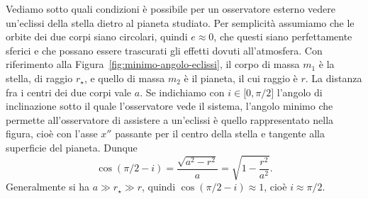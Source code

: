 Vediamo sotto quali condizioni è possibile per un osservatore esterno vedere
un'eclissi della stella dietro al pianeta studiato. Per semplicità assumiamo che
le orbite dei due corpi siano circolari, quindi $e \approx 0$, che questi siano
perfettamente sferici e che possano essere trascurati gli effetti dovuti
all'atmosfera. Con riferimento alla Figura~\ref{fig:minimo-angolo-eclissi}, il
corpo di massa $m_1$ è la stella, di raggio $r_\star$, e quello di massa $m_2$ è
il pianeta, il cui raggio è $r$. La distanza fra i centri dei due corpi vale
$a$. Se indichiamo con $i \in \mathopen{[}0, \pi/2\mathclose{]}$ l'angolo di
inclinazione sotto il quale l'osservatore vede il sistema, l'angolo minimo che
permette all'osservatore di assistere a un'eclissi è quello rappresentato nella
figura, cioè con l'asse $x''$ passante per il centro della stella e tangente
alla superficie del pianeta. Dunque
\begin{equation}
  \cos(\pi/2 - i) = \frac{\sqrt{a^2 - r^2}}{a} = \sqrt{1 - \frac{r^2}{a^2}}.
\end{equation}
Generalmente si ha $a \gg r_\star \gg r$, quindi $\cos(\pi/2 - i) \approx 1$,
cioè $i \approx \pi/2$.

